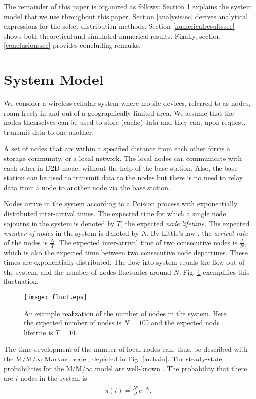 \documentclass[10pt,conference]{IEEEtran}
\begin{document}
The remainder of this paper is organized as follows: Section
\ref{systemmodelsec} explains the system model that we use throughout
this paper. Section \ref{analysissec} derives analytical expressions
for the select distribution methods. Section \ref{numericalresultssec}
shows both theoretical and simulated numerical results. Finally,
section \ref{conclusionssec} provides concluding remarks.


\section{System Model}\label{systemmodelsec}

We consider a wireless cellular system where mobile devices, referred
to as nodes, roam freely in and out of a geographically limited area.
We assume that the nodes themselves can be used to store (cache) data
and they can, upon request, transmit data to one another.

A set of nodes that are within a specified distance from each other
forms a storage community, or a local network. The local nodes can
communicate with each other in D2D mode, without the help of the
base station. Also, the base station can be used to transmit data to
the nodes but there is no need to relay data from a node to another
node via the base station.

Nodes arrive in the system according to a Poisson process with
exponentially distributed inter-arrival times. The expected time for
which a single node sojourns in the system is denoted by $T$, the
expected \emph{node lifetime}. The expected \emph{number of nodes} in
the system is denoted by $N$. By Little's law \cite{little}, the
\emph{arrival rate} of the nodes is $\frac{N}{T}$. The expected
inter-arrival time of two consecutive nodes is $\frac{T}{N}$, which is also the
expected time between two consecutive node departures. These times are
exponentially distributed. The flow into system equals the flow out of
the system, and the number of nodes fluctuates around $N$. Fig. \ref{fluct} exemplifies this fluctuation.
\begin{figure}[tb]
\centering \texttt{[image: fluct.eps]}
\caption{An example realization of the number of nodes in the system. Here the expected number of nodes is $N=100$ and the expected node lifetime is $T=10$.}
\label{fluct}
\end{figure}

The time development of the number of local nodes can, thus, be
described with the M/M/$\infty$ Markov model, depicted in Fig.
\ref{mchain}. The steady-state probabilities for the M/M/$\infty$
model are well-known \cite{harrison}. The probability that there are
$i$ nodes in the system is
\begin{align}
\pi(i)=\frac{N^i}{i!}e^{-N}.
\label{poisson}
\end{align}
\end{document}
